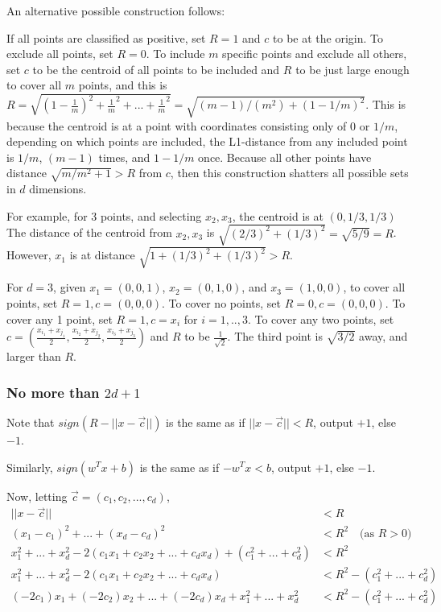 \documentclass[]{article}
\begin{document}
An alternative possible construction follows:

If all points are classified as positive, set $R=1$ and $c$  to be at the origin. To exclude all points, set $R=0$. To include $m$ specific points and exclude all others, set $c$ to be the centroid of all points to be included and $R$ to be just large enough to cover all $m$ points, and this is $R=\sqrt{(1-\frac{1}{m})^2 + \frac{1}{m}^2 + ... + \frac{1}{m}^2} = \sqrt{(m-1)/(m^2)+(1-1/m)^2}$. This is because the centroid is at a point with coordinates consisting only of $0$ or $1/m$, depending on which points are included, the L1-distance from any included point is $1/m$, $(m-1)$ times, and $1-1/m$ once. Because all other points have distance $\sqrt{m/m^2 + 1} > R$ from $c$, then this construction shatters all possible sets in $d$ dimensions.

For example, for 3 points, and selecting $x_2, x_3$, the centroid is at $(0,1/3,1/3)$ The distance of the centroid from $x_2,x_3$ is $\sqrt{(2/3)^2+(1/3)^2} = \sqrt{5/9} = R$. However, $x_1$ is at distance $\sqrt{1 + (1/3)^2 + (1/3)^2} > R$.

For $d=3$, given $x_1=(0,0,1)$, $x_2=(0,1,0)$, and $x_3=(1,0,0)$, to cover all points, set $R=1, c=(0,0,0)$. To cover no points, set $R=0, c=(0,0,0)$. To cover any 1 point, set $R=1, c=x_i$ for $i=1,..,3$. To cover any two points, set $c=(\frac{x_{i_1}+x_{j_1}}{2}, \frac{x_{i_2}+x_{j_2}}{2}, \frac{x_{i_3}+x_{j_3}}{2})$ and $R$ to be $\frac{1}{\sqrt{2}}$. The third point is $\sqrt{3/2}$ away, and larger than $R$.

\subsubsection{No more than $2d+1$}
Note that $sign(R-||x-\vec c||)$ is the same as if $||x-\vec c|| < R$, output $+1$, else $-1$.

Similarly, $sign(w^Tx+b)$ is the same as if $-w^Tx < b$, output $+1$, else $-1$.

Now, letting $\vec c = (c_1,c_2,...,c_d)$,
\begin{align*}
||x-\vec c|| &< R \\
(x_1-c_1)^2 + ... + (x_d-c_d)^2 &< R^2 \quad \text{(as $R > 0$)}\\
x_1^2 + ... + x_d^2 -2(c_1x_1 + c_2x_2 + ... + c_dx_d) + (c_1^2 + ... + c_d^2) &< R^2 \\
x_1^2 + ... + x_d^2 -2(c_1x_1 + c_2x_2 + ... + c_dx_d) &< R^2 - (c_1^2 + ... + c_d^2) \\
(-2c_1)x_1 + (-2c_2)x_2 + ... + (-2c_d)x_d + x_1^2 + ... + x_d^2 &< R^2 - (c_1^2 + ... + c_d^2) \\
\end{align*}
\end{document}
